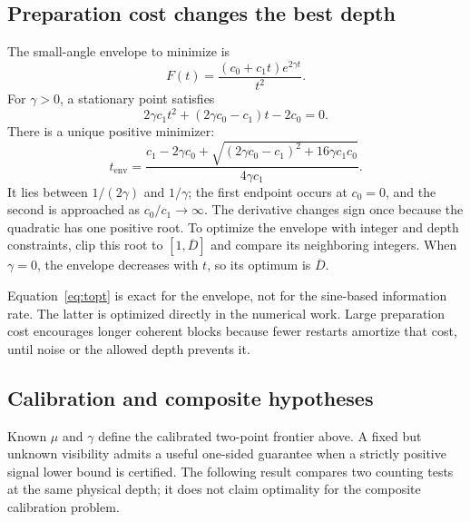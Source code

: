 \documentclass[11pt,a4paper]{article}
\theoremstyle{definition}
\theoremstyle{remark}
\numberwithin{equation}{section}
\begin{document}


\subsection{Preparation cost changes the best depth}
The small-angle envelope to minimize is
\begin{equation}
 F(t)=\frac{(c_0+c_1t)e^{2\gamma t}}{t^2}.
\end{equation}
For $\gamma>0$, a stationary point satisfies
\begin{equation}
 2\gamma c_1t^2+(2\gamma c_0-c_1)t-2c_0=0.
\end{equation}
There is a unique positive minimizer:
\begin{equation}\label{eq:topt}
 t_{\mathrm{env}}=
 \frac{c_1-2\gamma c_0+
 \sqrt{(2\gamma c_0-c_1)^2+16\gamma c_1c_0}}
 {4\gamma c_1}.
\end{equation}
It lies between $1/(2\gamma)$ and $1/\gamma$; the first endpoint occurs
at $c_0=0$, and the second is approached as $c_0/c_1\to\infty$.
The derivative changes sign once because the quadratic has one positive
root. To optimize the envelope with integer and depth constraints, clip
this root to $[1,\overline D]$ and compare its neighboring integers.
When $\gamma=0$, the envelope decreases with $t$, so its optimum is
$\overline D$.

Equation~\eqref{eq:topt} is exact for the envelope, not for the sine-based
information rate. The latter is optimized directly in the numerical work.
Large preparation cost encourages longer coherent blocks because fewer
restarts amortize that cost, until noise or the allowed depth prevents it.

\subsection{Calibration and composite hypotheses}\label{sec:calibration}
Known $\mu$ and $\gamma$ define the calibrated two-point frontier above.
A fixed but unknown visibility admits a useful one-sided guarantee when
a strictly positive signal lower bound is certified. The following result
compares two counting tests at the same physical depth; it does not claim
optimality for the composite calibration problem.
\end{document}
